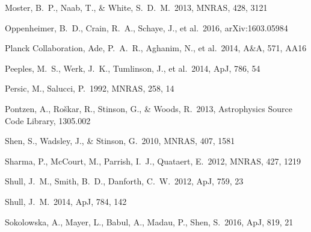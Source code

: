 \documentclass[useAMS,usenatbib]{mn2e}
\def \apj {ApJ}
\def \mnras {MNRAS}
\def \aap {A\&A}
\begin{document}
\begin{thebibliography}{}
 Moster, B.~P., Naab, T., 
\& White, S.~D.~M.\ 2013, \mnras, 428, 3121 





%
 Oppenheimer, B.~D., Crain, R.~A., Schaye, J., et al.\ 2016, arXiv:1603.05984


  Planck Collaboration, Ade, P.~A.~R., Aghanim, N., et al.\ 2014,
  \aap, 571, AA16 
 
 Peeples, M.~S., Werk, J.~K., Tumlinson, J., et al.\ 2014, \apj, 786, 54

 Persic, M., Salucci, P.\ 1992, \mnras, 258, 14

 Pontzen, A., Ro{\v s}kar, R., Stinson, G., \& Woods, R.\ 2013, Astrophysics Source Code Library, 1305.002 





 Shen, S., Wadsley, J., 
\& Stinson, G.\ 2010, \mnras, 407, 1581 

Sharma, P., McCourt, M., Parrish, I.~J., Quataert, E.\ 2012, \mnras, 427, 1219

Shull, J.~M., Smith, B.~D., Danforth, C.~W.\ 2012, \apj, 759, 23

%
 Shull, J.~M.\ 2014, \apj, 784, 142

Sokolowska, A., Mayer, L., Babul, A., Madau, P., Shen, S.\ 2016, \apj, 819, 21


\end{thebibliography}
\end{document}
